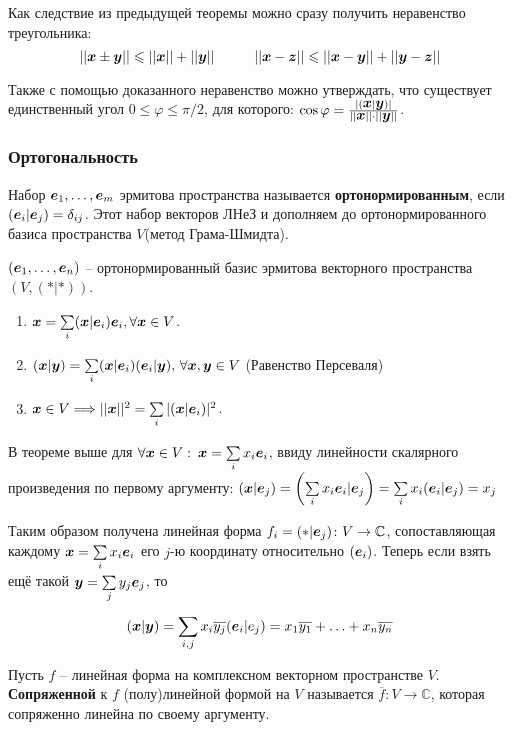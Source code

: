 Как следствие из предыдущей теоремы можно сразу получить неравенство треугольника:
$$||\mbox{\boldmath $x$} \pm \mbox{\boldmath $y$}|| \leqslant ||\mbox{\boldmath $x$}|| + ||\mbox{\boldmath $y$}|| \hspace{1cm} ||\mbox{\boldmath $x$} - \mbox{\boldmath $z$}|| \leqslant ||\mbox{\boldmath $x$} - \mbox{\boldmath $y$}|| + ||\mbox{\boldmath $y$}-\mbox{\boldmath $z$}||$$

Также с помощью доказанного неравенство можно утверждать, что существует единственный угол $0 \leq \varphi \leq \pi/2$, для которого: $\cos \varphi = \frac{|(\mbox{\boldmath $x$}|\mbox{\boldmath $y$})|}{||\mbox{\boldmath $x$}||\cdot ||\mbox{\boldmath $y$}||}$.

\subsubsection{Ортогональность}
\begin{to_def} 
	 Набор $\mbox{\boldmath $e$}_1,\ldots,\mbox{\boldmath $e$}_m$ эрмитова пространства называется \textbf{ортонормированным}, если $(\mbox{\boldmath $e$}_i|\mbox{\boldmath $e$}_j) = \delta_{i j}$. Этот набор векторов ЛНеЗ и дополняем до ортонормированного базиса пространства $V$(метод Грама-Шмидта).
\end{to_def}

\begin{to_thr} 
	$(\mbox{\boldmath $e$}_1,\ldots,\mbox{\boldmath $e$}_n)$ -- ортонормированный базис эрмитова векторного пространства $(V, (*|*))$. 

	\begin{enumerate}[label = \roman*)	]
		\item $\mbox{\boldmath $x$} = \sum\limits_{ i }^{   } (\mbox{\boldmath $x$}|\mbox{\boldmath $e$}_i)\mbox{\boldmath $e$}_i, \forall \mbox{\boldmath $x$} \in V$.

		\item $(\mbox{\boldmath $x$}|\mbox{\boldmath $y$}) = \sum\limits_{ i }^{   } (\mbox{\boldmath $x$}|\mbox{\boldmath $e$}_i)(\mbox{\boldmath $e$}_i|\mbox{\boldmath $y$}),\, \forall \mbox{\boldmath $x$}, \mbox{\boldmath $y$} \in V$ (Равенство Персеваля)

		\item $\mbox{\boldmath $x$} \in V \Longrightarrow ||\mbox{\boldmath $x$}||^2 = \sum\limits_{ i }^{   } |(\mbox{\boldmath $x$}|\mbox{\boldmath $e$}_i)|^2$.
	\end{enumerate}
\end{to_thr}

В теореме выше для $\forall \mbox{\boldmath $x$} \in V: \: \mbox{\boldmath $x$} = \sum\limits_{ i }^{   } x_i \mbox{\boldmath $e$}_i$, ввиду линейности скалярного произведения по первому аргументу: $(\mbox{\boldmath $x$}|\mbox{\boldmath $e$}_j) = \left(\sum\limits_{ i }^{   } x_i \mbox{\boldmath $e$}_i|\mbox{\boldmath $e$}_j\right) = \sum\limits_{ i }^{   } x_i(\mbox{\boldmath $e$}_i|\mbox{\boldmath $e$}_j) = x_j$

Таким образом получена линейная форма $f_i = (*|\mbox{\boldmath $e$}_j) \colon V \to \mathbb{C}$, сопоставляющая каждому $\mbox{\boldmath $x$} = \sum\limits_{ i }^{   } x_i \mbox{\boldmath $e$}_i$ его $j$-ю координату относительно $(\mbox{\boldmath $e$}_i)$.
Теперь если взять ещё такой $\mbox{\boldmath $y$} = \sum\limits_{ j }^{   } y_j \mbox{\boldmath $e$}_j$, то
$$
(\mbox{\boldmath $x$}|\mbox{\boldmath $y$}) = \sum\limits_{ i,j }^{   } x_i \overline{y_j} (\mbox{\boldmath $e$}_i|e_j) = x_1 \overline{y_1} + \ldots + x_n \overline{y_n}
$$
\begin{to_def} 
	 Пусть $f$ -- линейная форма на комплексном векторном пространстве $V$. \textbf{Сопряженной} к $f$ (полу)линейной формой на $V$ называется $\overline{f}\colon V \to \mathbb{C}$, которая сопряженно линейна по своему аргументу.
\end{to_def}

